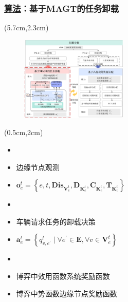 \begin{frame}
\frametitle{\englishfont \underline{算法}：基于MAGT的任务卸载}
\newBackground
\begin{center}
\begin{textblock*}{\textwidth}(5.7cm,2.3cm)
\begin{figure}
\includegraphics[width=0.45\textwidth]{fig/Fig3-3-solution-model2.pdf}
\end{figure}
\end{textblock*}
\end{center}

\begin{center}
\begin{textblock*}{0.6\textwidth}(0.5cm,2cm)
\begin{itemize} \englishfont
	\item[\ding{111}] {\color{cqublue}{系统状态}}
	\item 边缘节点观测
	\item $\boldsymbol{o}_{e}^{t}=\left\{e, t, \mathbf{Dis}_{\mathbf{V}_{e}^{t}}, \mathbf{D}_{\mathbf{K}_{e}^{t}}, \mathbf{C}_{\mathbf{K}_{e}^{t}}, \mathbf{T}_{\mathbf{K}_{v}^{t}}\right\}$
	\item[\ding{111}] {\color{cqublue}{动作空间}}
	\item 车辆请求任务的卸载决策
	\item $\boldsymbol{a}_{e}^{t} = \left\{ q_{v, e^{\prime}}^t \mid \forall e^{\prime} \in \mathbf{E}, \forall v \in \mathbf{V}_{e}^{t} \right\}$
	\item[\ding{111}] {\color{cqublue}{奖励函数}}
	\item 博弈中效用函数系统奖励函数
	\item 博弈中势函数边缘节点奖励函数
\end{itemize}
\end{textblock*}
\end{center}

\end{frame}

